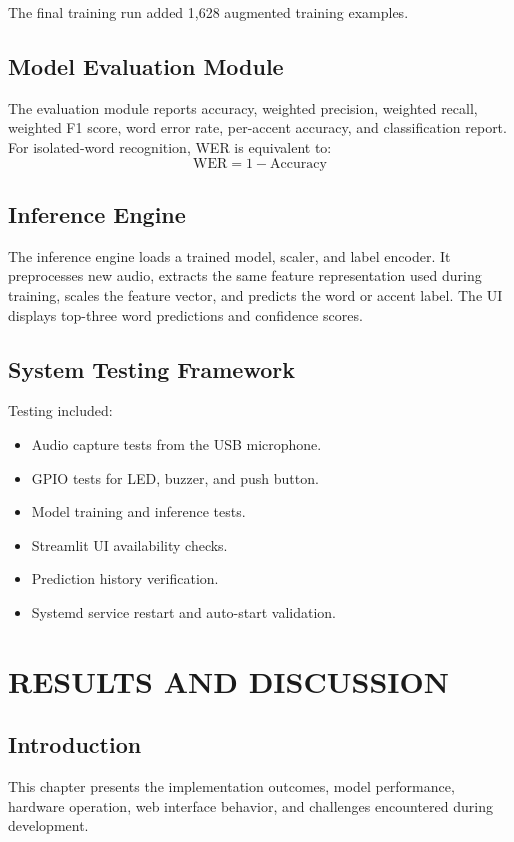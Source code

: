 \documentclass[12pt,a4paper]{report}
\begin{document}
The final training run added 1,628 augmented training examples.

\section{Model Evaluation Module}
The evaluation module reports accuracy, weighted precision, weighted recall, weighted F1 score, word error rate, per-accent accuracy, and classification report. For isolated-word recognition, WER is equivalent to:
\[
\text{WER} = 1 - \text{Accuracy}
\]

\section{Inference Engine}
The inference engine loads a trained model, scaler, and label encoder. It preprocesses new audio, extracts the same feature representation used during training, scales the feature vector, and predicts the word or accent label. The UI displays top-three word predictions and confidence scores.

\section{System Testing Framework}
Testing included:
\begin{itemize}
    \item Audio capture tests from the USB microphone.
    \item GPIO tests for LED, buzzer, and push button.
    \item Model training and inference tests.
    \item Streamlit UI availability checks.
    \item Prediction history verification.
    \item Systemd service restart and auto-start validation.
\end{itemize}

\chapter{RESULTS AND DISCUSSION}

\section{Introduction}
This chapter presents the implementation outcomes, model performance, hardware operation, web interface behavior, and challenges encountered during development.
\end{document}
